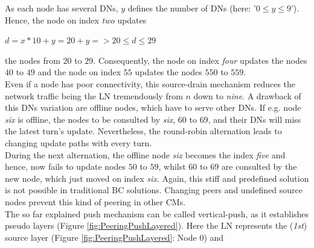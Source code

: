\begin{figure}[!b]
\end{figure}
As each node has several \gls{DNs}, $y$ defines the number of \gls{DNs} (here: '$0 \leq y \leq 9$').
Hence, the node on index \textit{two} updates	
\begin{center}
	$d = x*10+y = 20+y => 20 \leq d \leq 29$
\end{center}	
the nodes from $20$ to $29$.
Consequently, the node on index \textit{four} updates the nodes $40$ to $49$ and
the node on index $55$ updates the nodes $550$ to $559$. \\
Even if a node has poor connectivity, this source-drain mechanism reduces the network traffic being the \gls{LN} tremendously from $n$ down to \textit{nine}.
A drawback of this \gls{DNs} variation are offline nodes, which have to serve other \gls{DNs}.
If e.g. node \textit{six} is offline, the nodes to be consulted by \textit{six}, $60$ to $69$, and their \gls{DNs} will miss the latest turn's update.
Nevertheless, the round-robin alternation leads to changing update paths with every turn. \\
During the next alternation, the offline node \textit{six} becomes the index \textit{five} and hence, now fails to update nodes $50$ to $59$, whilst $60$ to $69$ are consulted by the new node, which just moved on index \textit{six}.
Again, this stiff and predefined solution is not possible in traditional \gls{BC} solutions.
Changing peers and undefined source nodes prevent this kind of peering in other \gls{CM}s.\\
The so far explained push mechanism can be called vertical-push, as it establishes pseudo layers (Figure \ref{fig:PeeringPushLayered}).
Here the \gls{LN} represents the (\textit{1st}) source layer (Figure \ref{fig:PeeringPushLayered}: Node 0) and

